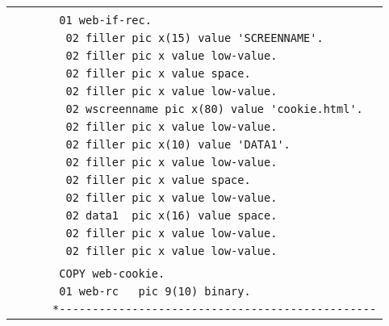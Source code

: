{\begin{tabular}{|l|}
\vspace{-0.4em}\verb!!\\
\vspace{-0.4em}\verb!       01 web-if-rec.!\\
\vspace{-0.4em}\verb!        02 filler pic x(15) value 'SCREENNAME'.!\\
\vspace{-0.4em}\verb!        02 filler pic x value low-value.!\\
\vspace{-0.4em}\verb!        02 filler pic x value space.!\\
\vspace{-0.4em}\verb!        02 filler pic x value low-value.!\\
\vspace{-0.4em}\verb!        02 wscreenname pic x(80) value 'cookie.html'.!\\
\vspace{-0.4em}\verb!        02 filler pic x value low-value.!\\
\vspace{-0.4em}\verb!        02 filler pic x(10) value 'DATA1'.!\\
\vspace{-0.4em}\verb!        02 filler pic x value low-value.!\\
\vspace{-0.4em}\verb!        02 filler pic x value space.!\\
\vspace{-0.4em}\verb!        02 filler pic x value low-value.!\\
\vspace{-0.4em}\verb!        02 data1  pic x(16) value space.!\\
\vspace{-0.4em}\verb!        02 filler pic x value low-value.!\\
\vspace{-0.4em}\verb!        02 filler pic x value low-value.!\\
\vspace{-0.4em}\verb!!\\
\vspace{-0.4em}\verb!       COPY web-cookie.!\\
\vspace{-0.4em}\verb!       01 web-rc   pic 9(10) binary.!\\
\vspace{-0.4em}\verb!      *------------------------------------------------!\\

\end{tabular}}
